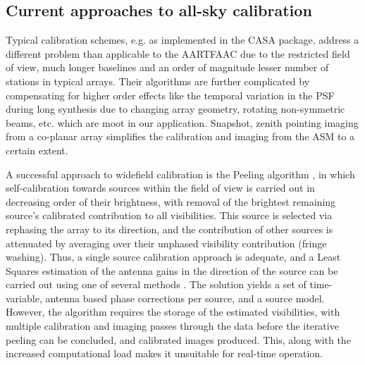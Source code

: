 \documentclass{aa}
\begin{document}

\subsection{Current approaches to all-sky calibration}
Typical calibration schemes, e.g. as  implemented in the CASA package, address a
different problem than applicable to the AARTFAAC due to the restricted field of
view, much longer baselines and an  order of magnitude lesser number of stations
in typical arrays. Their algorithms  are further complicated by compensating for
higher  order  effects  like the  temporal  variation  in  the PSF  during  long
synthesis  due  to  changing   array  geometry,  rotating  non-symmetric  beams,
etc. which are moot in our application. Snapshot, zenith pointing imaging from a
co-planar array simplifies the calibration and imaging from the ASM to a certain
extent.

A  successful  approach  to  widefield  calibration  is  the  Peeling  algorithm
\citep{noordam2004peel,vdTol2007selfcallofar}, in which self-calibration towards
sources within  the field of  view is carried  out in decreasing order  of their
brightness,  with  removal  of   the  brightest  remaining  source's  calibrated
contribution  to all  visibilities. This  source is  selected via  rephasing the
array to its  direction, and the contribution of other  sources is attenuated by
averaging over their unphased  visibility contribution (fringe washing). Thus, a
single source calibration  approach is adequate, and a  Least Squares estimation
of the antenna gains in the direction of the source can be carried out using one
of  several  methods \citep{boonstra2003gain}.  The  solution  yields  a set  of
time-variable,  antenna  based  phase  corrections  per  source,  and  a  source
model.   However,  the  algorithm   requires  the   storage  of   the  estimated
visibilities,  with multiple  calibration and  imaging passes  through  the data
before  the   iterative  peeling  can   be  concluded,  and   calibrated  images
produced. This, along with the  increased computational load makes it unsuitable
for real-time operation.
\end{document}
